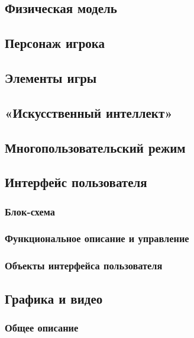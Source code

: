 \documentclass{article}
\begin{document}
\subsection{Физическая модель}

\subsection{Персонаж игрока}

\subsection{Элементы игры}

\subsection{«Искусственный интеллект»}

\subsection{Многопользовательский режим}

\subsection{Интерфейс пользователя}

\subsubsection{Блок-схема}

\subsubsection{Функциональное описание и управление}

\subsubsection{Объекты интерфейса пользователя}

\subsection{Графика и видео}

\subsubsection{Общее описание}
\end{document}
